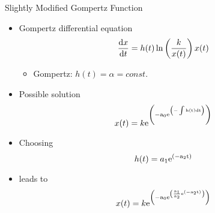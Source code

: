 \documentclass{beamer}
\newcommand{\e}{\rm e}
\newcommand{\dx}{{\rm d}x}
\newcommand{\dt}{{\rm d}t}
\begin{document}
\begin{frame}{Slightly Modified Gompertz Function}{}

  \begin{itemize}
  \item
    Gompertz differential equation
\[
\frac{\dx}{\dt}=h(t)\ln\left({\frac{k}{x(t)}}\right)x(t)
\]
 \begin{itemize}
    \item
      Gompertz: $h(t)=\alpha=const.$  
    \end{itemize}
\item
Possible solution
\[
x(t)=k \e^{\left(-{a_0} \e^{\left(-\int{h(t) \dt}\right)}\right)}
\]
   
  \item
   Choosing
\[
h(t)=a_1 \e^{\left(-a_2 t\right)}
\]
  \item
   leads to
\[
x(t)=k \e^{\left(-{a_0}\e^{\left(\frac{a_1}{a_2} \e^{\left({-a_2 t}\right)}\right)}\right)}
\]

  \end{itemize}  
\end{frame}
\end{document}
